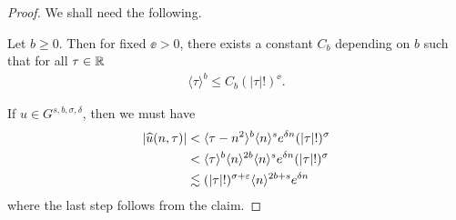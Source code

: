 %
%
%
%
\begin{proof}
  We shall need the following.
  \begin{framed}
  \begin{claim}
    Let $b \ge 0$. Then for fixed $ \ee > 0$,
    there exists a constant $C_{b}$ depending on $b$ such
    that for all $\tau \in \mathbb{R}$
    \begin{equation*}
    \begin{split}
      \langle \tau \rangle ^{b} \le C_{b} (| \tau |!)^{\ee}.
    \end{split}
    \end{equation*}
  \end{claim}
\end{framed}
If $u \in G^{s, b, \sigma, \delta}$, then we must have
%
%
\begin{equation*}
\begin{split}
| \widehat{u}(n, \tau) |
& <  \langle \tau - n^{2} \rangle ^{b} \langle n \rangle ^{s}  e^{\delta n}
(| \tau |!)^{\sigma}
\\
& <  \langle\tau  \rangle ^{b} \langle n \rangle ^{2b} \langle n \rangle
^{s} e^{\delta n} (| \tau |!)^{\sigma}
\\
& \lesssim (| \tau |!)^{\sigma + \varepsilon} \langle n \rangle ^{2b + s}
e^{\delta n}
\end{split}
\end{equation*}
%
where the last step follows from the claim.
%
\end{proof}
%
%
%
%
